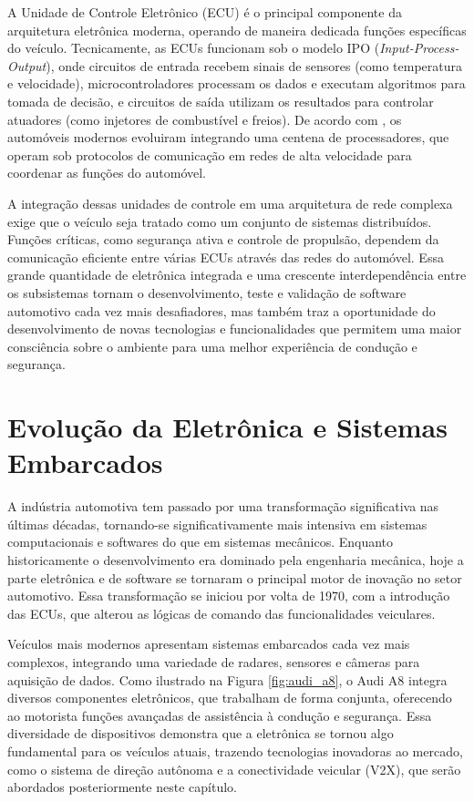 A Unidade de Controle Eletrônico (ECU) é o principal componente da arquitetura eletrônica moderna, operando de maneira dedicada funções específicas do
veículo. Tecnicamente, as ECUs funcionam sob o modelo IPO (\textit{Input-Process-Output}), onde circuitos de entrada recebem sinais de sensores (como
temperatura e velocidade), microcontroladores processam os dados e executam algoritmos para tomada de decisão, e circuitos de saída utilizam os resultados
para controlar atuadores (como injetores de combustível e freios). De acordo com \cite{ref:munir2018}, os automóveis modernos evoluiram integrando uma centena
de processadores, que operam sob protocolos de comunicação em redes de alta velocidade para coordenar as funções do automóvel.

A integração dessas unidades de controle em uma arquitetura de rede complexa exige que o veículo seja tratado como um conjunto de sistemas distribuídos.
Funções críticas, como segurança ativa e controle de propulsão, dependem da comunicação eficiente entre várias ECUs através das redes do automóvel. Essa
grande quantidade de eletrônica integrada e uma crescente interdependência entre os subsistemas tornam o desenvolvimento, teste e validação de software
automotivo cada vez mais desafiadores, mas também traz a oportunidade do desenvolvimento de novas tecnologias e funcionalidades que permitem uma maior
consciência sobre o ambiente para uma melhor experiência de condução e segurança.

\section{Evolução da Eletrônica e Sistemas Embarcados}

A indústria automotiva tem passado por uma transformação significativa nas últimas décadas, tornando-se significativamente mais intensiva em sistemas
computacionais e softwares do que em sistemas mecânicos. Enquanto historicamente o desenvolvimento era dominado pela engenharia mecânica, hoje a parte
eletrônica e de software se tornaram o principal motor de inovação no setor automotivo. Essa transformação se iniciou por volta de 1970, com a introdução
das ECUs, que alterou as lógicas de comando das funcionalidades veiculares.  

Veículos mais modernos apresentam sistemas embarcados cada vez mais complexos, integrando uma variedade de radares, sensores e câmeras para aquisição de
dados. Como ilustrado na Figura \ref{fig:audi_a8}, o Audi A8 integra diversos componentes eletrônicos, que trabalham de forma conjunta, oferecendo ao motorista
funções avançadas de assistência à condução e segurança. Essa diversidade de dispositivos demonstra que a eletrônica se tornou algo fundamental para os veículos
atuais, trazendo tecnologias inovadoras ao mercado, como o sistema de direção autônoma e a conectividade veicular (V2X), que serão abordados posteriormente 
neste capítulo.

